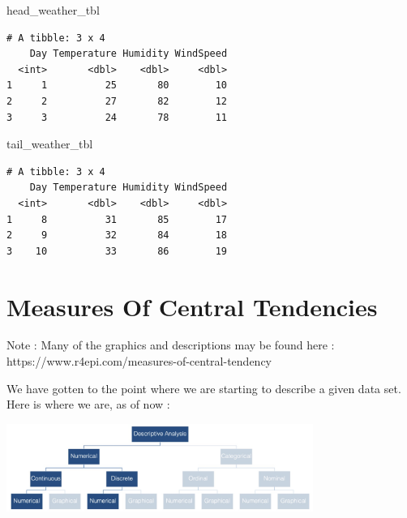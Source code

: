 \documentclass[
  letterpaper,
  DIV=11,
  numbers=noendperiod]{scrreprt}
\newenvironment{Shaded}{\begin{snugshade}}{\end{snugshade}}
\newcommand{\NormalTok}[1]{\textcolor[rgb]{0.00,0.23,0.31}{#1}}
\begin{document}
\begin{Shaded}
\begin{Highlighting}[]
\NormalTok{head\_weather\_tbl}
\end{Highlighting}
\end{Shaded}

\begin{verbatim}
# A tibble: 3 x 4
    Day Temperature Humidity WindSpeed
  <int>       <dbl>    <dbl>     <dbl>
1     1          25       80        10
2     2          27       82        12
3     3          24       78        11
\end{verbatim}

\begin{Shaded}
\begin{Highlighting}[]
\NormalTok{tail\_weather\_tbl}
\end{Highlighting}
\end{Shaded}

\begin{verbatim}
# A tibble: 3 x 4
    Day Temperature Humidity WindSpeed
  <int>       <dbl>    <dbl>     <dbl>
1     8          31       85        17
2     9          32       84        18
3    10          33       86        19
\end{verbatim}


\chapter*{Measures Of Central
Tendencies}\label{measures-of-central-tendencies}


Note : Many of the graphics and descriptions may be found here :
https://www.r4epi.com/measures-of-central-tendency

We have gotten to the point where we are starting to describe a given
data set. Here is where we are, as of now :

\includegraphics[width=0.75\textwidth,height=\textheight]{./images/Daily-4-Pic-1.jpg}
\end{document}
